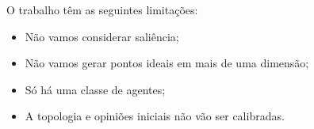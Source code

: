 O trabalho têm as seguintes limitações:
\begin{itemize}
\item Não vamos considerar saliência;
\item Não vamos gerar pontos ideais em mais de uma dimensão;
\item Só há uma classe de agentes;
\item A topologia e opiniões iniciais não vão ser calibradas.
\end{itemize}







